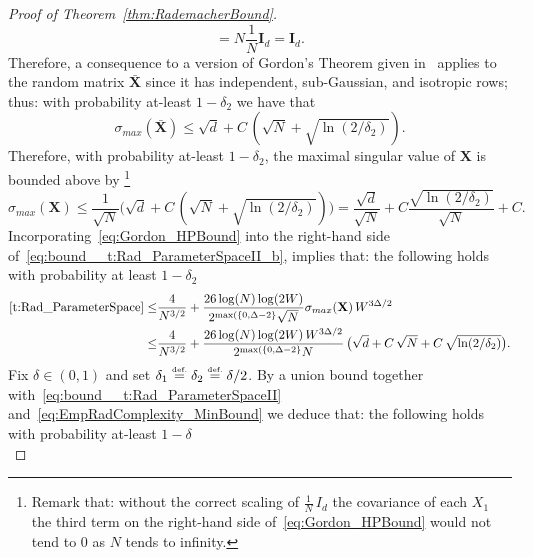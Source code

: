 \documentclass{article}
\numberwithin{equation}{section}
\theoremstyle{definition}
\newcommand{\eqdef}{\ensuremath{\stackrel{\mbox{\upshape\tiny def.}}{=}}}
\begin{document}
\begin{proof}[{Proof of Theorem~\ref{thm:RademacherBound}}]
\[=
N
\frac1{N}\mathbf{I}_d
=
\mathbf{I}_d
.
\]
Therefore, a consequence to a version of Gordon's Theorem given in~\citep[Theorem 4.6.1]{Vershynin_HighDimensionalProbBook_2018} applies to the random matrix $\bar{\mathbf{X}}$ since it has independent, sub-Gaussian, and isotropic rows; thus: with probability at-least $1-\delta_2$ we have that 
\begin{equation*}
\sigma_{max}(\bar{\mathbf{X}})\le \sqrt{d} + C\, (\sqrt{N}+ \sqrt{\ln(2/\delta_2)})
.
\end{equation*}
Therefore, with probability at-least $1-\delta_2$, the maximal singular value of $\mathbf{X}$ is bounded above by
\footnote{Remark that: without the correct scaling of $\frac{1}{N}\,I_d$ the covariance of each $X_1$ the third term on the right-hand side of~\eqref{eq:Gordon_HPBound} would not tend to $0$ as $N$ tends to infinity.}
\begin{equation}
\label{eq:Gordon_HPBound}
    \sigma_{max}(\mathbf{X})
\le 
    \frac1{\sqrt{N}}\big(
        \sqrt{d} + C\, (\sqrt{N}+ \sqrt{\ln(2/\delta_2)})
    \big)
=
    \frac{\sqrt{d}}{\sqrt{N}}
    +
    C\frac{
        \sqrt{\ln(2/\delta_2)}
    }{\sqrt{N}}
    +
    C
.
\end{equation}
Incorporating~\eqref{eq:Gordon_HPBound} into the right-hand side of~\eqref{eq:bound__t:Rad_ParameterSpaceII_b}, implies that: the following holds with probability at least $1-\delta_2$
\begin{equation}
\label{eq:bound__t:Rad_ParameterSpaceII}
\begin{aligned}
    \eqref{t:Rad_ParameterSpace} 
\le &
    \frac{4}{N^{3/2}}
    +
    \frac{26\log(N)\log(2W)}{
        2^{\max(\{0,\Delta-2\}}
        \sqrt{N}
    }
    \sigma_{max}(\mathbf{X})
    \,W^{3\Delta/2}
\\
\le &
    \frac{4}{
    N^{3/2}}
    +
    \frac{
        26\log(N)\log(2W)
        \,
        W^{3\Delta/2}
    }{
        2^{\max(\{0,\Delta-2\}}
    N
    }
    \,
    \big(
        \sqrt{d}
        +
        C\,\sqrt{N}
        +
        C\,\sqrt{\ln(2/\delta_2)}
    \big)
.
\end{aligned}
\end{equation} 
Fix $\delta \in (0,1)$ and set $\delta_1\eqdef \delta_2\eqdef \delta/2$.  By a union bound together with~\eqref{eq:bound__t:Rad_ParameterSpaceII} and~\eqref{eq:EmpRadComplexity_MinBound} we deduce that: the following holds with probability at-least $1-\delta$
\begin{equation}

\end{equation}
\end{proof}
\end{document}
